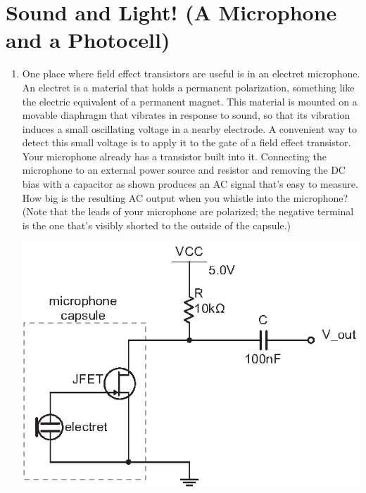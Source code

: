 \section{Sound and Light! (A Microphone and a Photocell)}
\label{lab_microphone_photocell}


\bigskip

\begin{enumerate}[wide]

\item One place where field effect transistors are useful is in an electret microphone.  An electret is a material that holds a permanent polarization, something like the electric equivalent of a permanent magnet.  This material is mounted on a movable diaphragm that vibrates in response to sound, so that its vibration induces a small oscillating voltage in a nearby electrode.  A convenient way to detect this small voltage is to apply it to the gate of a field effect transistor.  Your microphone already has a transistor built into it.  Connecting the microphone to an external power source and resistor and removing the DC bias with a capacitor as shown produces an AC signal that's easy to measure.  How big is the resulting AC output when you whistle into the microphone?   (Note that the leads of your microphone are polarized; the negative terminal is the one that's visibly shorted to the outside of the capsule.)  
\begin{center}
\includegraphics{microphone_photocell/microphone_circuit.eps}
\end{center}


\end{enumerate}
